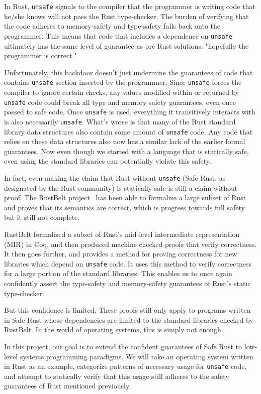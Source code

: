 \documentclass[12pt]{article}
\begin{document}
In Rust, \texttt{unsafe} signals to the compiler that the programmer is writing code that he/she knows will not pass the Rust type-checker. The burden of verifying that the code adheres to memory-safety and type-safety falls back onto the programmer. This means that code that includes a dependence on \texttt{unsafe} ultimately has the same level of guarantee as pre-Rust solutions: "hopefully the programmer is correct."

Unfortunately, this backdoor doesn't just undermine the guarantees of code that contains \texttt{unsafe} section inserted by the programmer. Since \texttt{unsafe} forces the compiler to ignore certain checks, any values modified within or returned by \texttt{unsafe} code could break all type and memory safety guarantees, even once passed to safe code. Once \texttt{unsafe} is used, everything it transitively interacts with is also necessarily \texttt{unsafe}. What's worse is that many of the Rust standard library data structures also contain some amount of \texttt{unsafe} code. Any code that relies on these data structures also now has a similar lack of the earlier formal guarantees. Now even though we started with a language that is statically safe, even using the standard libraries can potentially violate this safety.

In fact, even making the claim that Rust without \texttt{unsafe} (Safe Rust, as designated by the Rust community) is statically safe is still a claim without proof. The RustBelt project~\cite{jung2017rustbelt} has been able to formalize a large subset of Rust and proves that its semantics are correct, which is progress towards full safety but it still not complete. 

RustBelt formalized a subset of Rust's mid-level intermediate representation (MIR) in Coq, and then produced machine checked proofs that verify correctness. It then goes further, and provides a method for proving correctness for new libraries which depend on \texttt{unsafe} code. It uses this method to verify correctness for a large portion of the standard libraries. This enables us to once again confidently assert the type-safety and memory-safety guarantees of Rust's static type-checker.

But this confidence is limited. These proofs still only apply to programs written in Safe Rust whose dependencies are limited to the standard libraries checked by RustBelt. In the world of operating systems, this is simply not enough. %

In this project, our goal is to extend the confident guarantees of Safe Rust to low-level systems programming paradigms. We will take an operating system written in Rust as an example, categorize patterns of necessary usage for \texttt{unsafe} code, and attempt to statically verify that this usage still adheres to the safety guarantees of Rust mentioned previously. 
\end{document}
